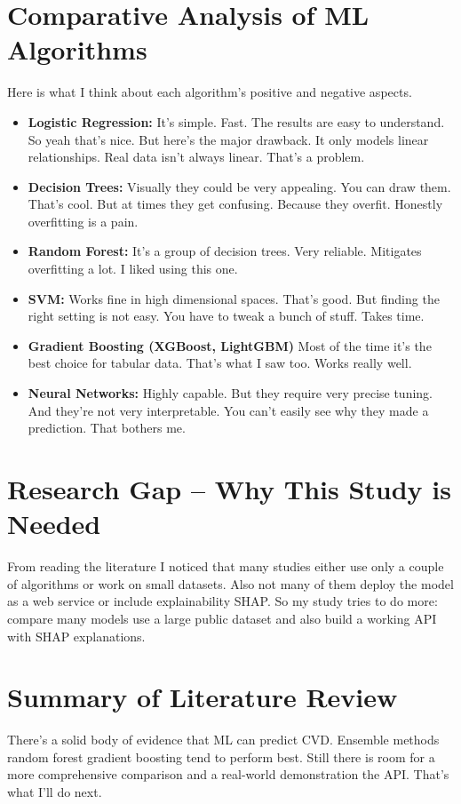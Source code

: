 \documentclass[12pt, a4paper, oneside]{book}
\begin{document}
\section{Comparative Analysis of ML Algorithms}

Here is what I think about each algorithm's positive and negative aspects.

\begin{itemize}
\item \textbf{Logistic Regression:} It's simple. Fast. The results are easy to understand. So yeah that's nice. But here's the major drawback. It only models linear relationships. Real data isn't always linear. That's a problem.

\item \textbf{Decision Trees:} Visually they could be very appealing. You can draw them. That's cool. But at times they get confusing. Because they overfit. Honestly overfitting is a pain.

\item \textbf{Random Forest:} It's a group of decision trees. Very reliable. Mitigates overfitting a lot. I liked using this one.

\item \textbf{SVM:} Works fine in high dimensional spaces. That's good. But finding the right setting is not easy. You have to tweak a bunch of stuff. Takes time.

\item \textbf{Gradient Boosting (XGBoost, LightGBM)} Most of the time it's the best choice for tabular data. That's what I saw too. Works really well.

\item \textbf{Neural Networks:} Highly capable. But they require very precise tuning. And they're not very interpretable. You can't easily see why they made a prediction. That bothers me.
\end{itemize}
\section{Research Gap -- Why This Study is Needed}
From reading the literature I noticed that many studies either use only a couple of algorithms or work on small datasets. Also not many of them deploy the model as a web service or include explainability SHAP. So my study tries to do more: compare many models use a large public dataset and also build a working API with SHAP explanations.

\section{Summary of Literature Review}
There's a solid body of evidence that ML can predict CVD. Ensemble methods random forest gradient boosting tend to perform best. Still there is room for a more comprehensive comparison and a real-world demonstration the API. That's what I'll do next.
\end{document}
